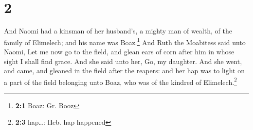 \hypertarget{section-1}{%
\section{2}\label{section-1}}

 And Naomi had a kinsman of her husband's, a mighty man of
wealth, of the family of Elimelech; and his name was Boaz.\footnote{\textbf{2:1}
  Boaz: Gr. Booz}  And Ruth the Moabitess said unto Naomi,
Let me now go to the field, and glean ears of corn after him in whose
sight I shall find grace. And she said unto her, Go, my daughter.
 And she went, and came, and gleaned in the field after
the reapers: and her hap was to light on a part of the field belonging
unto Boaz, who was of the kindred of Elimelech.\footnote{\textbf{2:3}
  hap\ldots: Heb. hap happened}

